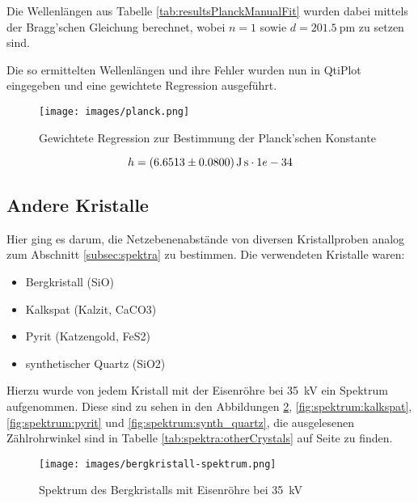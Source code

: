 Die Wellenl\"angen  aus Tabelle \ref{tab:resultsPlanckManualFit}  wurden dabei
mittels  der  Bragg'schen Gleichung  berechnet,  wobei  $n  =  1$ sowie  $d  =
\SI{201.5}{\pico\meter}$ zu setzen sind.

Die so ermittelten Wellenl\"angen und ihre Fehler wurden nun in QtiPlot eingegeben
und eine gewichtete Regression ausgef\"uhrt.

\begin{figure}[h!]
    \centering
    \texttt{[image: images/planck.png]}
    \caption{Gewichtete Regression zur Bestimmung der Planck'schen Konstante}
    \label{fig:planck}
\end{figure}

\begin{equation*}
    h = \SI{6.6513 \pm 0.08}{\joule\second} \cdot 1e-34
\end{equation*}

\clearpage
\subsection{Andere Kristalle}
\label{subsec:othercrystals}

Hier  ging  es darum,  die  Netzebenenabst\"ande  von diversen  Kristallproben
analog  zum  Abschnitt   \ref{subsec:spektra}  zu  bestimmen. Die  verwendeten
Kristalle waren:

\begin{itemize}
    \item
        Bergkristall (SiO)
    \item
        Kalkspat (Kalzit, CaCO3)
    \item
        Pyrit (Katzengold, FeS2)
    \item
        synthetischer Quartz (SiO2)
\end{itemize}

Hierzu    wurde    von   jedem    Kristall    mit    der   Eisenr\"ohre    bei
\SI{35}{\kilo\volt}  ein   Spektrum  aufgenommen. Diese   sind  zu   sehen  in
den Abbildungen  \ref{fig:spektrum:bergkristall}, \ref{fig:spektrum:kalkspat},
\ref{fig:spektrum:pyrit} und \ref{fig:spektrum:synth_quartz}, die ausgelesenen
Z\"ahlrohrwinkel  sind in  Tabelle  \ref{tab:spektra:otherCrystals} auf  Seite
\pageref{tab:spektra:otherCrystals} zu finden.

\begin{figure}[h!]
    \centering
    \texttt{[image: images/bergkristall-spektrum.png]}
    \caption{Spektrum des Bergkristalls mit Eisenr\"ohre bei \SI{35}{\kilo\volt}}
    \label{fig:spektrum:bergkristall}
\end{figure}


